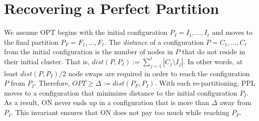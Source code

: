 \documentclass[manuscript,screen=true]{acmart}
\newcommand{\OPT}{\mathit{OPT}}
\newcommand{\PPOBRP}{PP-BRP}
\newcommand\mahmoud[1]{\color{green}\textbf{\\ Mahmoud: #1}\\\color{black}}
\newcommand\maciek[1]{\color{brown}\textbf{\\ Maciek: #1}\color{black}}
\begin{document}
\section{Recovering a Perfect Partition}	\label{sec:ppl}

     
We assume OPT begins with the initial configuration
$P_I = I_1, \dots, I_{\ell}$ and moves to the final partition
$P_F = F_1, \dots, F_{\ell}$.
 The \emph{distance} of a configuration $P = C_1, \dots, C_{\ell}$ from the initial configuration is the number of nodes in $P$ that do not reside in their initial cluster.
    That is,
    $\mathit{dist}(P, P_I) := \sum_{j=1}^{\ell} | C_j \setminus I_j |$. 
In other words,
at least $\mathit{dist}(P, P_I)/2$ node swaps are required in order to reach the configuration $P$ from $P_I$.
Therefore,
$\OPT \geq \Delta:= dist(P_F, P_I) $.
 With each re-partitioning,
  PPL moves to a configuration that minimizes distance to the initial configuration $P_I$.
As a result,
ON never ends up in a configuration that is more than $\Delta$ away from $P_I$.
This invariant ensures that ON does not pay too much while reaching $P_F$.
\end{document}
